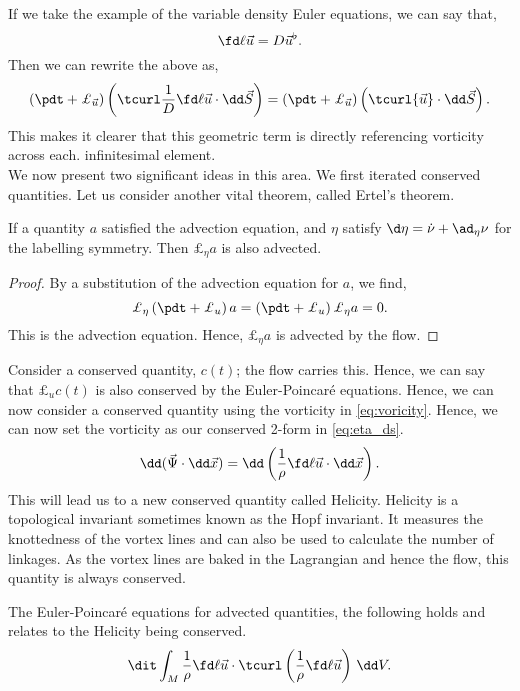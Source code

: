 \noindent
If we take the example of the variable density Euler equations, we can say that,
$$ \fd \ell {\vec u} = D\vec u^\flat. $$
Then we can rewrite the above as,
$$ \left( \pdt + \pounds_{\vec u} \right) \left( \tcurl \frac{1}{D}\fd \ell {\vec u} \cdot \dd \vec S \right) = \left( \pdt + \pounds_{\vec u} \right) \left( \tcurl {\vec u} \cdot \dd \vec S \right). $$
This makes it clearer that this geometric term is directly referencing vorticity across each. infinitesimal element.\\

\noindent
We now present two significant ideas in this area. We first iterated conserved quantities. Let us consider another vital theorem, called Ertel's theorem.
\begin{nthm}
  If a quantity $a$ satisfied the advection equation, and $\eta$ satisfy $\d\eta = \dot \nu + \ad_{\eta}\nu$ for the labelling symmetry. Then $\pounds_\eta a$ is also advected.
\end{nthm}
\begin{proof}
  By a substitution of the advection equation for $a$, we find,
  $$ \pounds_\eta \left(\pdt + \pounds_u \right)a = \left(\pdt + \pounds_u\right)\pounds_\eta a = 0. $$
  This is the advection equation. Hence, $\pounds_\eta a$ is advected by the flow.
\end{proof}
\noindent
Consider a conserved quantity, $c(t)$; the flow carries this. Hence, we can say that $\pounds_u c(t)$ is also conserved by the Euler-Poincar\'e equations. Hence, we can now consider a conserved quantity using the vorticity in \eqref{eq:voricity}. Hence, we can now set the vorticity as our conserved 2-form in \eqref{eq:eta_ds}.
$$ \dd (\vec\Psi \cdot \dd \vec x) = \dd \left( \frac{1}{\rho}\fd \ell {\vec u} \cdot \dd \vec x \right). $$
This will lead us to a new conserved quantity called Helicity. Helicity is a topological invariant sometimes known as the Hopf invariant. It measures the knottedness of the vortex lines and can also be used to calculate the number of linkages. As the vortex lines are baked in the Lagrangian and hence the flow, this quantity is always conserved.
\begin{nlemma}
  The Euler-Poincar\'e equations for advected quantities, the following holds and relates to the Helicity being conserved.
  $$ \dit\int_M \frac{1}{\rho} \fd \ell {\vec u} \cdot \tcurl\left( \frac{1}{\rho} \fd \ell {\vec u} \right) \,\dd V. $$
\end{nlemma}
